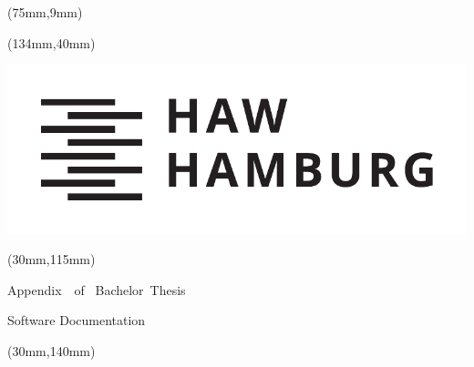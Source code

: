 %
%

\thispagestyle{empty}
\begin{titlepage}
{\selectfont

  \hfuzz=20pt
\begin{textblock*}{\textwidth}(75mm,9mm)
  \begin{minipage}[b][0cm][b]{\textwidth}
  \hfuzz=20pt
  \fontsize{16pt}{16pt}
  \selectfont
    \begin{flushleft}
    	  \IthesisNDAFull
    \end{flushleft}
  \end{minipage}
\end{textblock*}

\begin{textblock*}{\textwidth}(134mm,40mm)
  \begin{minipage}[b][0cm][b]{\textwidth}
    \includegraphics[scale=0.5]{style/HAW_Marke_schwarz}
  \end{minipage}
\end{textblock*}

\begin{textblock*}{\textwidth}(30mm,115mm)
  \begin{minipage}[b][0cm][b]{\textwidth}
    \fontsize{22pt}{20pt}
    \selectfont
  	\begin{flushright}
      Appendix\ \thechapter\ of \ Bachelor\ Thesis
  	\end{flushright}
  	\begin{flushright}
  		Software Documentation
  	\end{flushright}
  \end{minipage}
\end{textblock*}

\begin{textblock*}{\textwidth}(30mm,140mm)
  \begin{minipage}[b][0cm][b]{\textwidth}
  \fontsize{14pt}{20pt}
  \selectfont
    \begin{flushright}
      \IthesisAuthor
  	\end{flushright}
  \end{minipage}
\end{textblock*}

}
\end{titlepage}

